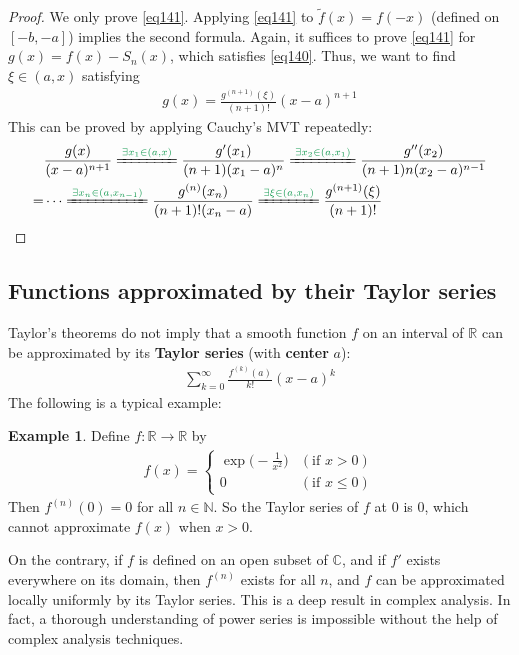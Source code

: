 \documentclass[12pt,b5paper,notitlepage]{article}
\theoremstyle{definition}
\newtheorem{eg}[df]{Example}
\theoremstyle{plain}
\newcommand{\wtd}{\widetilde}
\newcommand{\Cbb}{\mathbb C}
\newcommand{\Nbb}{\mathbb N}
\newcommand{\Rbb}{\mathbb R}
\newcommand{\dps}{\displaystyle}
\numberwithin{equation}{section}
\begin{document}
\begin{proof}
We only prove \eqref{eq141}. Applying \eqref{eq141} to $\wtd f(x)=f(-x)$ (defined on $[-b,-a]$) implies the second formula. Again, it suffices to prove \eqref{eq141} for $g(x)=f(x)-S_n(x)$, which satisfies \eqref{eq140}. Thus, we want to find $\xi\in(a,x)$ satisfying
\begin{align*}
g(x)=\frac{g^{(n+1)}(\xi)}{(n+1)!}(x-a)^{n+1}
\end{align*}
This can be proved by applying Cauchy's MVT repeatedly:
\begin{align*}
&\frac{g(x)}{(x-a)^{n+1}}\xlongequal{{\color{ForestGreen}\exists x_1\in (a,x)}}\frac{g'(x_1)}{(n+1)(x_1-a)^n}\xlongequal{{\color{ForestGreen}\exists x_2\in (a,x_1)}}\frac{g''(x_2)}{(n+1)n(x_2-a)^{n-1}}\\
=&\cdots \xlongequal{{\color{ForestGreen}\exists x_n\in (a,x_{n-1})}}\frac{g^{(n)}(x_n)}{(n+1)!(x_n-a)}\xlongequal{{\color{ForestGreen}\exists \xi\in (a,x_n)}}\frac{g^{(n+1)}(\xi)}{(n+1)!}
\end{align*}
\end{proof}




\subsection{Functions approximated by their Taylor series}


Taylor's theorems do not imply that a smooth function $f$ on an interval of $\Rbb$ can be approximated by its \textbf{Taylor series}  (with \textbf{center} $a$):
\begin{align}
\sum_{k=0}^\infty \frac{f^{(k)}(a)}{k!}(x-a)^k
\end{align}
The following is a typical example:

\begin{eg}\label{lb358}
Define $f:\Rbb\rightarrow\Rbb$ by
\begin{align*}
f(x)=\left\{
\begin{array}{ll}
\dps \exp\big(-\frac 1{x^2}\big)& (\text{if }x>0)\\[1ex]
0&(\text{if }x\leq 0)
\end{array}
\right.
\end{align*}
Then $f^{(n)}(0)=0$ for all $n\in\Nbb$. So the Taylor series of $f$ at $0$ is $0$, which cannot approximate $f(x)$ when $x>0$.
\end{eg}


On the contrary, if $f$ is defined on an open subset of $\Cbb$, and if $f'$ exists everywhere on its domain, then $f^{(n)}$ exists for all $n$, and $f$ can be approximated locally uniformly by its Taylor series. This is a deep result in complex analysis. In fact, a thorough understanding of power series is impossible without the help of complex analysis techniques. 
\end{document}
